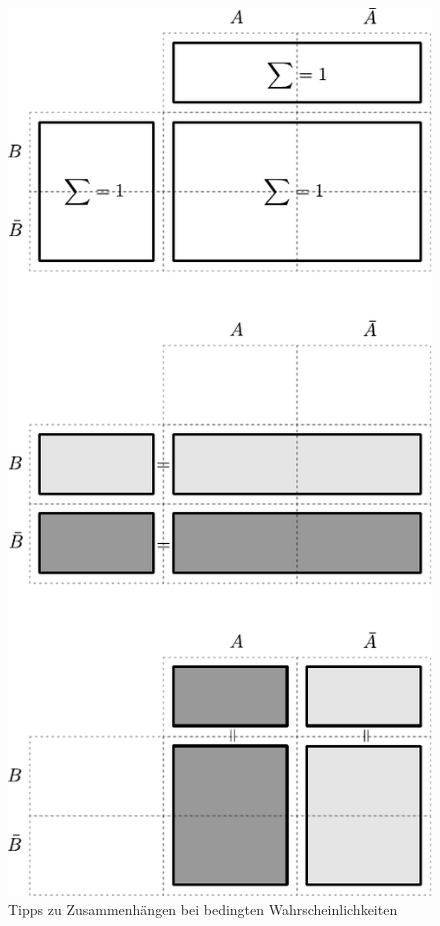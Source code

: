 \begin{figure}[h!]
        \centering
        \includegraphics[scale=\graphscale]{bedingte-wahrscheinlichkeit-tipps.pdf}
        \caption{Tipps zu Zusammenhängen bei bedingten Wahrscheinlichkeiten}
\end{figure}

